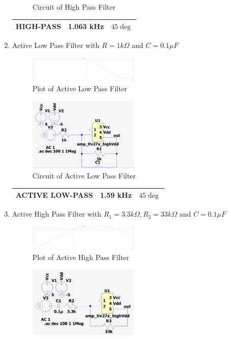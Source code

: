 \documentclass{article}
\begin{document}
\begin{enumerate}
\begin{figure}[H]
        \caption{Circuit of High Pass Filter}
    \end{figure}
    \begin{tabular}{|c|c|c|}
        \hline
        HIGH-PASS & 1.063 kHz & $45\deg$ \\
        \hline
        \end{tabular}
    \item Active Low Pass Filter with $R = 1k \Omega$ and $C = 0.1 \mu F$
    \begin{figure}[H]
        \centering
        \includegraphics[width=0.5\textwidth]{4simPlot.png}
        \caption{Plot of Active Low Pass Filter}
    \end{figure}
    \begin{figure}[H]
        \centering
        \includegraphics[width=0.5\textwidth]{4simCircuit.png}
        \caption{Circuit of Active Low Pass Filter}
    \end{figure}
    \begin{tabular}{|c|c|c|}
        \hline
        ACTIVE LOW-PASS & 1.59 kHz & $45\deg$ \\
        \hline
        \end{tabular}
    \item Active High Pass Filter with $R_1 = 3.3k \Omega, R_2 = 33k \Omega$ and $C = 0.1 \mu F$
    \begin{figure}[H]
        \centering
        \includegraphics[width=0.5\textwidth]{5simPlot.png}
        \caption{Plot of Active High Pass Filter}
    \end{figure}
    \begin{figure}[H]
        \centering
        \includegraphics[width=0.5\textwidth]{5simCircuit.png}

\end{figure}
\end{enumerate}
\end{document}
